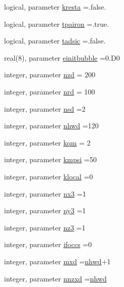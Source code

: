 \begin{DoxyCompactItemize}
\item 
logical, parameter \hyperlink{namespaceparamr_a673c357a29cfbdb53822605a24b3ab51}{kresta} =.false.
\item 
logical, parameter \hyperlink{namespaceparamr_acd8a21779b3d29dfe3626fe843905246}{tpairon} =.true.
\item 
logical, parameter \hyperlink{namespaceparamr_af3cdaaabc4241e21b1befbb1ca885452}{tadsic} =.false.
\item 
real(8), parameter \hyperlink{namespaceparamr_a0c843211548f6ed84cee87900828e1bd}{einitbubble} =0.\+D0
\item 
integer, parameter \hyperlink{namespaceparamr_aadc71badb7f729eaddb68ef0f99b135a}{nzd} = 200
\item 
integer, parameter \hyperlink{namespaceparamr_a61e145b7c61984697a9be78aa8905d94}{nrd} = 100
\item 
integer, parameter \hyperlink{namespaceparamr_a4ff6f5c4777134383ea2daf9fa8709ff}{nsd} =2
\item 
integer, parameter \hyperlink{namespaceparamr_a85e42468af30077429194d0dac1b9081}{nhwd} =120
\item 
integer, parameter \hyperlink{namespaceparamr_af7be40bfd8856e8845a2587d4443e56b}{kqm} = 2
\item 
integer, parameter \hyperlink{namespaceparamr_a65de7b11ee5606af6be31579043dddbc}{kmpsi} =50
\item 
integer, parameter \hyperlink{namespaceparamr_ae7c591a6ca8ece03b8a7ca95857f180f}{klocal} =0
\item 
integer, parameter \hyperlink{namespaceparamr_a1f6d5f50edd0cdf8afaf6ea7e87db420}{nx3} =1
\item 
integer, parameter \hyperlink{namespaceparamr_a245f99c088c6d567bfea27dcd9217928}{ny3} =1
\item 
integer, parameter \hyperlink{namespaceparamr_a024bce0c675160a27120f8bc6effe098}{nz3} =1
\item 
integer, parameter \hyperlink{namespaceparamr_a198d0a4ec3820faf393944e71c1afc24}{ifoccs} =0
\item 
integer, parameter \hyperlink{namespaceparamr_ae5d95bb2efa5483f6b31595801daa446}{mxd} =\hyperlink{namespaceparamr_a85e42468af30077429194d0dac1b9081}{nhwd}+1
\item 
integer, parameter \hyperlink{namespaceparamr_a2d912f07f6699ff298fd9887808a79fb}{nnzxd} =\hyperlink{namespaceparamr_a85e42468af30077429194d0dac1b9081}{nhwd}
\item 

\end{DoxyCompactItemize}

